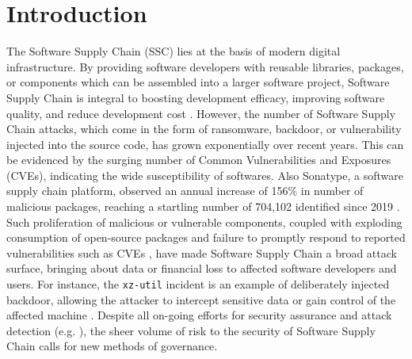 \section{Introduction}\label{sec:intro}

\par The Software Supply Chain (SSC) lies at the basis of modern digital
infrastructure. By providing software developers with reusable libraries,
packages, or components which can be assembled into a larger software
project\citep{sscdirection}, Software Supply Chain is integral to boosting
development efficacy, improving software quality, and reduce development cost
\citep{brooks1987no,mythicalmanmonth}. However, the number of Software Supply
Chain attacks, which come in the form of ransomware, backdoor, or vulnerability
injected into the source code, has grown exponentially over recent years.
This can be evidenced by the surging number of Common Vulnerabilities and
Exposures (CVEs), indicating the wide susceptibility of softwares. Also
Sonatype, a software supply chain platform, observed an annual increase of 156\%
in number of malicious packages, reaching a startling number of 704,102 identified
since 2019 \citep{sonatype2024report}. Such proliferation of malicious or
vulnerable components, coupled with exploding consumption of open-source 
packages and failure to promptly respond to reported vulnerabilities such as CVEs 
\citep{sonatype2024report}, have made Software Supply Chain
a broad attack surface, bringing about data or financial loss to
affected software developers and users.
For instance, the \texttt{xz-util} incident is an example of deliberately
injected backdoor, allowing the attacker to intercept sensitive data
or gain control of the affected machine \citep{xzincident}.
Despite all on-going efforts for security 
assurance and attack detection (e.g. \citep{konala25metadata,11022932,10695665}),
the sheer volume of risk to the
security of Software Supply Chain calls for new methods of governance.

